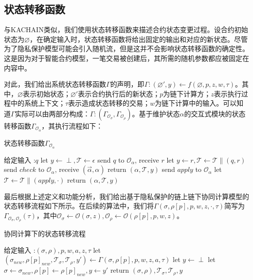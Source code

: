 \subsection{状态转移函数}
与KACHAIN\cite{9505181}类似，我们使用状态转移函数来描述合约状态变更过程。设合约初始状态为$\varnothing$，在确定输入时，状态转移函数将给出固定的输出和对应的新状态。尽管为了隐私保护模型可能会引入随机流，但是这并不会影响状态转移函数的确定性。这是因为对于智能合约模型，一笔交易被创建后，其所需的随机参数都应被固定在内容中。

对此，我们给出系统状态转移函数$\Gamma$的声明，即$\Gamma:(\varnothing', y) \leftarrow f(\varnothing, p, z, w,\tau)$。其中，$\varnothing$表示初始状态；$\varnothing'$表示合约执行后的新状态；$p$为链下计算方；$z$表示执行过程中的系统上下文；$\tau$表示造成状态转移的交易；$w$为链下计算中的输入。可以知道$\Gamma$实际可以由两部分构成：$\Gamma: (\Gamma_{\mathcal{O}_\sigma}, \Gamma_{\mathcal{O}_\rho})$。基于维护状态$\alpha$的交互式模块的状态转移函数$\Gamma_{\mathcal{O}_\alpha}$，其执行流程如下：

\begin{breakablealgorithm}
    \caption{状态转移函数$\Gamma_{\mathcal{O}_\alpha}$}
    \label{alg:ch3-3}
    \begin{algorithmic} 
        \item[给定输入]:$q$
        \STATE let $y \leftarrow \perp, \mathcal{T} \leftarrow \epsilon$
        \STATE send $q$ to $\mathcal{O}_\alpha$, receive $r$
        \STATE let $y \leftarrow r, \mathcal{T} \leftarrow \mathcal{T} \parallel (q, r)$
        \STATE send $check$ to $\mathcal{O}_\alpha$, receive $(\vec{\alpha}, \alpha)$
        \STATE return $(\alpha, \mathcal{T}, y)$
        \ENDIF
        \STATE send $apply$ to $\mathcal{O}_\alpha$
        \STATE let $\mathcal{T} \leftarrow \mathcal{T} \parallel (apply, \cdot)$
        \STATE return $(\alpha, \mathcal{T}, y)$
    \end{algorithmic}
\end{breakablealgorithm}

最后根据上述定义和功能分析，我们给出基于隐私保护的链上链下协同计算模型的状态转移流程如下所示。在后续的算法中，我们将$\Gamma(\sigma, \rho[p], p, w, z, \cdot, \tau)$简写为$\Gamma_{\mathcal{O}_\sigma, \mathcal{O}_\rho}(\tau)$，其中$\mathcal{O}_\sigma \leftarrow \mathcal{O}(\sigma, z), \mathcal{O}_\rho \leftarrow \mathcal{O}(\rho[p], p, w, z)$。

\begin{breakablealgorithm}
    \caption{协同计算下的状态转移流程}
    \label{alg:ch3-4}
    \begin{algorithmic} 
        \item [给定输入]:$(\sigma, \rho), p, w, a, z, \tau$
        \STATE let $(\sigma_{new}, \rho[p]_{new},\mathcal{T}_\sigma, \mathcal{T}_\rho, y') \leftarrow \Gamma(\sigma, \rho[p], p, w, z, a, \tau)$
        \STATE let $y \leftarrow \perp$
        \STATE let $\sigma \leftarrow \sigma_{new}, \rho[p] \leftarrow \rho[p]_{new}, y \leftarrow y'$
        \STATE return $(\sigma, \rho), \mathcal{T}_\sigma, \mathcal{T}_\rho, y$
    \end{algorithmic}
\end{breakablealgorithm}

